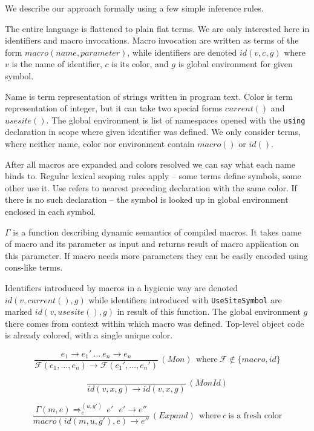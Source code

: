 \documentclass{llncs}
\newcommand{\infrule}[3]{
  \displaystyle
  \frac{#1}{#2}
  \, #3
}
\newcommand{\nf}[2]{#1 \rightarrow #2}
\newcommand{\colr}[2]{#1 \Rightarrow^{(u, g')}_{c} \, #2}
\begin{document}
We describe our approach formally using a few simple inference rules.

The entire language is flattened to plain flat terms. We are only
interested here in identifiers and macro invocations.  Macro invocation
are written as terms of the form $macro(name, parameter)$, while
identifiers are denoted $id(v,c,g)$ where $v$ is the name of identifier,
$c$ is its color, and $g$ is global environment for given symbol.

Name is term representation of strings written in program text. Color
is term representation of integer, but it can take two special forms
$current()$ and $usesite()$. The global environment is list of namespaces
opened with the \verb,using, declaration in scope where given identifier
was defined. We only consider terms, where neither name, color nor environment
contain $macro()$ or $id()$.

After all macros are expanded and colors resolved we can say what each
name binds to. Regular lexical scoping rules apply -- some terms define
symbols, some other use it. Use refers to nearest preceding declaration
with the same color. If there is no such declaration -- the symbol is
looked up in global environment enclosed in each symbol.

$\Gamma$ is a function describing dynamic semantics of compiled macros.
It takes name of macro and its parameter as input and returns result of
macro application on this parameter. If macro needs more parameters they
can be easily encoded using cons-like terms.

Identifiers introduced by macros in a hygienic way are denoted
$id(v,current(),g)$ while identifiers introduced with \verb,UseSiteSymbol,
are marked $id(v,usesite(),g)$ in result of this function. The
global environment $g$ there comes from context within which macro
was defined. Top-level object code is already colored, with a single
unique color.


$$
  \infrule{
    \nf{e_1}{e_1'} \ \ldots\ \nf{e_n}{e_n}
  }{
    \nf{
      \mathcal{F}(e_1, \ldots, e_n)
    }{
      \mathcal{F}(e_1', \ldots, e_n')
    }
  }{(Mon) \ \ \textrm{where}\ \mathcal{F} \notin \{ macro, id \}}
$$

$$
  \infrule{
  }{
    \nf{
      id (v, x, g)
    }{
      id (v, x, g)
    }
  }{(MonId)}
$$

$$
  \infrule{
    \colr{\Gamma(m,e)}{e'} \ \ \ \nf{e'}{e''}
  }{
    \nf{
      macro (id(m, u, g'), e)
    }{
      e''
    }
  }{(Expand) \ \ \textrm{where}\ c \ \textrm{is\ a\ fresh\ color}}
$$
\end{document}
